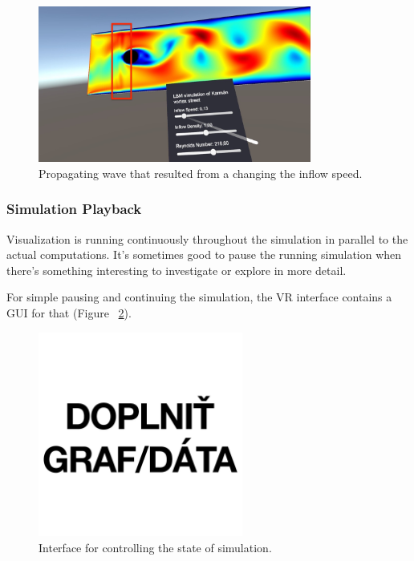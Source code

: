 \begin{figure}[!ht]
	\centering
	\includegraphics[width=0.8\textwidth]{figures/inflow-speed-change.jpeg}
	\caption{Propagating wave that resulted from a changing the inflow speed.}
	\label{fig:wave-propagation}
\end{figure}

\subsubsection{Simulation Playback}\label{sec:sim-playback}

Visualization is running continuously throughout the simulation in parallel to the actual computations. It's sometimes good to pause the running simulation when there's something interesting to investigate or explore in more detail.

For simple pausing and continuing the simulation, the VR interface contains a GUI for that (Figure~ \ref{fig:unity-pause-play}).

\begin{figure}[!ht]
	\centering
	\includegraphics[width=0.6\textwidth]{figures/empty.jpg}
	\caption{Interface for controlling the state of simulation.}
	\label{fig:unity-pause-play}
\end{figure}

